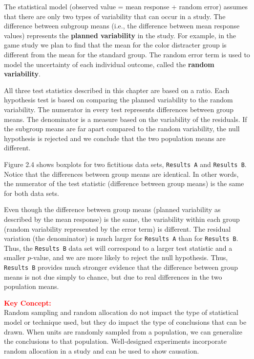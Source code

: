 \documentclass[
]{report}
\begin{document}
The statistical model (observed value = mean response + random error) assumes that there are only two types of variability that can occur in a study. The difference between subgroup means (i.e., the difference between mean response values) represents the \textbf{planned variability} in the study. For example, in the game study we plan to find that the mean for the color distracter group is different from the mean for the standard group. The random error term is used to model the uncertainty of each individual outcome, called the \textbf{random variability}.

All three test statistics described in this chapter are based on a ratio. Each hypothesis test is based on comparing the planned variability to the random variability. The numerator in every test represents differences between group means. The denominator is a measure based on the variability of the residuals. If the subgroup means are far apart compared to the random variability, the null hypothesis is rejected and we conclude that the two population means are different.

Figure 2.4 shows boxplots for two fictitious data sets, \texttt{Results\ A} and \texttt{Results\ B}. Notice that the differences between group means are identical. In other words, the numerator of the test statistic (difference between group means) is the same for both data sets.

Even though the difference between group means (planned variability as described by the mean response) is the same, the variability within each group (random variability represented by the error term) is different. The residual variation (the denominator) is much larger for \texttt{Results\ A} than for \texttt{Results\ B}. Thus, the \texttt{Results\ B} data set will correspond to a larger test statistic and a smaller \(p\)-value, and we are more likely to reject the null hypothesis. Thus, \texttt{Results\ B} provides much stronger evidence that the difference between group means is not due simply to chance, but due to real differences in the two population means.

\large

\textbf{\textcolor{red}{Key Concept:}}\\
\color{red}
Random sampling and random allocation do not impact the type of statistical model or technique used, but they do impact the type of conclusions that can be drawn. When units are randomly sampled from a population, we can generalize the conclusions to that population. Well-designed experiments incorporate random allocation in a study and can be used to show causation.
\color{black}
\normalsize
\end{document}
